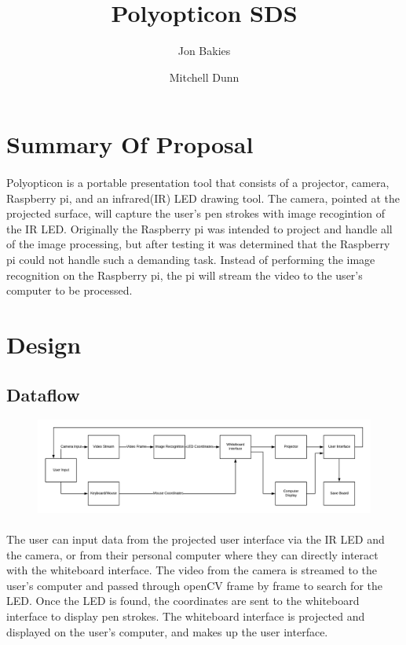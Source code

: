 \documentclass[12pt]{article}
\begin{document}
\title{Polyopticon SDS}
\author{Jon Bakies \and Mitchell Dunn} 

\maketitle
\newpage

\tableofcontents
\newpage

\section{Summary Of Proposal}
\paragraph{}
Polyopticon is a portable presentation tool that consists of a projector, camera, Raspberry pi, and an infrared(IR) LED drawing tool.
The camera, pointed at the projected surface, will capture the user's pen strokes with image recogintion of the IR LED.
Originally the Raspberry pi was intended to project and handle all of the image processing, but after testing it was determined that the Raspberry pi could not handle such a demanding task.
Instead of performing the image recognition on the Raspberry pi, the pi will stream the video to the user's computer to be processed.

\section{Design}
\subsection{Dataflow}
\begin{figure}[ht!]
\centering
\includegraphics[width=\textwidth, height=\textheight, keepaspectratio]{Dataflow.png}
\end{figure}
\paragraph{}
The user can input data from the projected user interface via the IR LED and the camera, or from their personal computer where they can directly interact with the whiteboard interface.
The video from the camera is streamed to the user's computer and passed through openCV frame by frame to search for the LED.  
Once the LED is found, the coordinates are sent to the whiteboard interface to display pen strokes.
The whiteboard interface is projected and displayed on the user's computer, and makes up the user interface.
\end{document}

